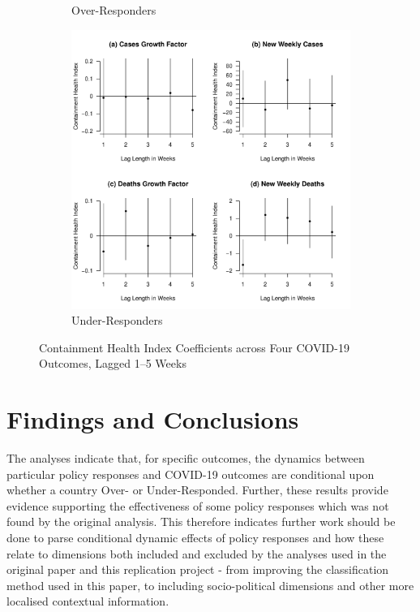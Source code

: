 \documentclass[12pt,letterpaper]{article}
\begin{document}
\begin{figure}[p]
\begin{subfigure}[b]{0.48\textwidth}
			\caption{Over-Responders}
			\label{fig:achi}
		\end{subfigure}
		\begin{subfigure}[b]{0.48\textwidth}
			\centering
			\includegraphics[width=\textwidth]{bchi.pdf}
			\caption{Under-Responders}
			\label{fig:bchi}
		\end{subfigure}
		\caption{Containment Health Index Coefficients across Four COVID-19 Outcomes, Lagged 1–5 Weeks}
		\label{fig:all_chi}
	\end{figure}

	\section*{Findings and Conclusions}
	\vspace{.25cm}	
	
	\noindent The analyses indicate that, for specific outcomes, the dynamics between particular policy responses and COVID-19 outcomes are conditional upon whether a country Over- or Under-Responded. Further, these results provide evidence supporting the effectiveness of some policy responses which was not found by the original analysis. This therefore indicates further work should be done to parse conditional dynamic effects of policy responses and how these relate to dimensions both included and excluded by the analyses used in the original paper and this replication project - from improving the classification method used in this paper, to including socio-political dimensions and other more localised contextual information.
\end{document}
